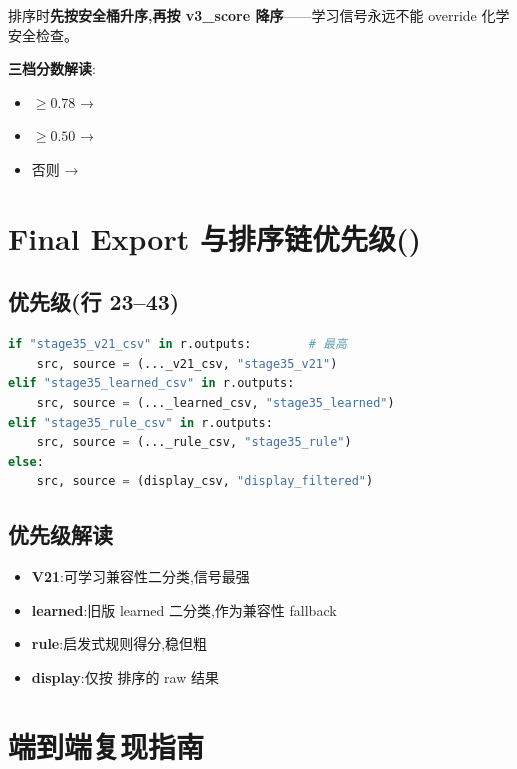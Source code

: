 排序时\textbf{先按安全桶升序,再按 v3\_score 降序}——学习信号永远不能 override 化学安全检查。

\textbf{三档分数解读}:
\begin{itemize}
    \item $\ge 0.78$ → 
    \item $\ge 0.50$ → 
    \item 否则 → 
\end{itemize}

\section{Final Export 与排序链优先级()}

\subsection{优先级(行 23--43)}

\begin{lstlisting}[language=Python]
if "stage35_v21_csv" in r.outputs:        # 最高
    src, source = (..._v21_csv, "stage35_v21")
elif "stage35_learned_csv" in r.outputs:
    src, source = (..._learned_csv, "stage35_learned")
elif "stage35_rule_csv" in r.outputs:
    src, source = (..._rule_csv, "stage35_rule")
else:
    src, source = (display_csv, "display_filtered")
\end{lstlisting}

\subsection{优先级解读}

\begin{itemize}
    \item \textbf{V21}:可学习兼容性二分类,信号最强
    \item \textbf{learned}:旧版 learned 二分类,作为兼容性 fallback
    \item \textbf{rule}:启发式规则得分,稳但粗
    \item \textbf{display}:仅按  排序的 raw 结果
\end{itemize}

\section{端到端复现指南}

